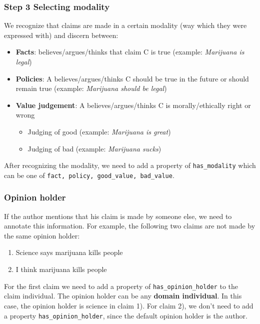 \subsubsection*{Step 3 Selecting modality}

We recognize that claims are made in a certain modality (way which they were
expressed with) and discern between:

\begin{itemize}
\item \textbf{Facts}:  believes/argues/thinks that claim C is true (example:
	\textit{Marijuana is legal})
\item \textbf{Policies}: A believes/argues/thinks C should be true in the
	future or should remain true  (example: \textit{Marijuana should be legal}) 
\item \textbf{Value judgement}: A believes/argues/thinks C is morally/ethically
	right or wrong
	\begin{itemize}
	\item Judging of good (example: \textit{Marijuana is great})
	\item Judging of bad (example: \textit{Marijuana sucks})
	\end{itemize}
\end{itemize}
After recognizing the modality, we need to add a property of \texttt{has\_modality} which
can be one of \texttt{fact, policy, good\_value, bad\_value}. 

\subsubsection*{Opinion holder}

If the author mentions that his claim is made by someone else, we need to
annotate this information. For example, the following two claims are not made
by the same opinion holder:

\begin{enumerate}
\item Science says marijuana kills people
\item I think marijuana kills people
\end{enumerate}
For the first claim we need to add a property of \texttt{has\_opinion\_holder} to the
claim individual. The opinion holder can be any \textbf{domain individual}. In this
case, the opinion holder is science in claim 1). For claim 2), we don't need to
add a property \texttt{has\_opinion\_holder}, since the default opinion holder is the
author. 

